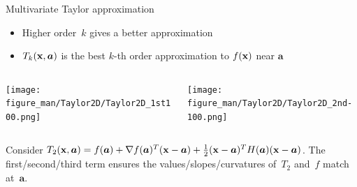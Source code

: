 \documentclass[11pt,compress,t,notes=noshow, xcolor=table]{beamer}
\begin{document}
\begin{vbframe}{Multivariate Taylor approximation}

\begin{itemize}
    \item Higher order~$k$ gives a better approximation
    \item $T_k(\mathbf{x},\bm{a})$ is the best $k$-th order approximation to $f(\mathbf{x})$ near $\bm{a}$
\end{itemize}

\begin{columns}
    \begin{column}{0.48\textwidth}
        \texttt{[image: figure\_man/Taylor2D/Taylor2D\_1st100.png]}
    \end{column}
    \begin{column}{0.48\textwidth}
        \texttt{[image: figure\_man/Taylor2D/Taylor2D\_2nd-100.png]}
    \end{column}
\end{columns}

Consider $T_2(\mathbf{x}, \bm{a}) = f(\bm{a}) + \nabla f(\bm{a})^T (\mathbf{x}-\bm{a}) + \frac{1}{2}(\mathbf{x}-\bm{a})^T H (\bm{a})(\mathbf{x}-\bm{a})$.
The first/second/third term ensures the values/slopes/curvatures of~$T_2$ and~$f$ match at~$\bm{a}$.

\end{vbframe}
\end{document}
